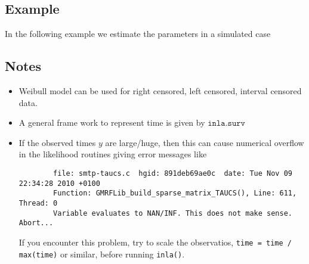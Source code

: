 \documentclass[a4paper,11pt]{article}
\begin{document}
\subsection*{Example}

In the following example we estimate the parameters in a simulated
case 

\subsection*{Notes}

\begin{itemize}
\item Weibull model can be used for right censored, left censored,
    interval censored data.
\item A general frame work to represent time is given by
    $\texttt{inla.surv}$
\item If the observed times $y$ are large/huge, then this can cause
    numerical overflow in the likelihood routines giving error
    messages like
\begin{verbatim}
        file: smtp-taucs.c  hgid: 891deb69ae0c  date: Tue Nov 09 22:34:28 2010 +0100
        Function: GMRFLib_build_sparse_matrix_TAUCS(), Line: 611, Thread: 0
        Variable evaluates to NAN/INF. This does not make sense. Abort...
\end{verbatim}
    If you encounter this problem, try to scale the observatios,
    \verb|time = time / max(time)| or similar, before running
    \verb|inla()|. 
\end{itemize}
\end{document}
